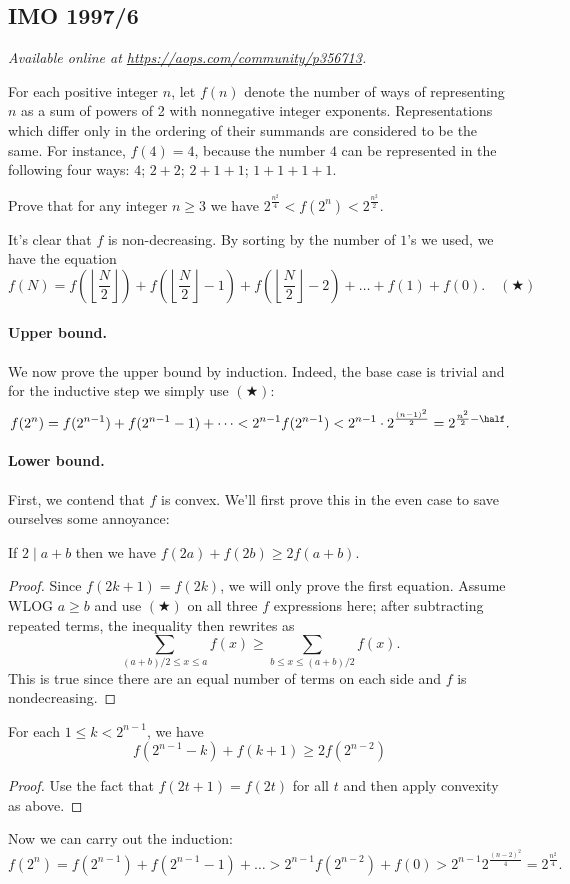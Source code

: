 \documentclass[11pt]{scrartcl}
\begin{document}
\subsection{IMO 1997/6}
\textsl{Available online at \url{https://aops.com/community/p356713}.}
\begin{mdframed}[style=mdpurplebox,frametitle={Problem statement}]
For each positive integer $n$,
let $f(n)$ denote the number of ways of representing $n$
as a sum of powers of 2 with nonnegative integer exponents.
Representations which differ only in the ordering
of their summands are considered to be the same.
For instance, $f(4) = 4$,
because the number $4$ can be represented in the following four ways:
$4$; $2+2$; $2+1+1$; $1+1+1+1$.

Prove that for any integer $n \geq 3$
we have $2^{\frac{n^2}{4}} < f(2^n) < 2^{\frac{n^2}2}$.
\end{mdframed}
It's clear that $f$ is non-decreasing.
By sorting by the number of $1$'s we used,
we have the equation
\[ f(N) =
  f\left( \left\lfloor \frac N2 \right\rfloor \right)
  +  f\left( \left\lfloor \frac N2 \right\rfloor -1 \right)
  +  f\left( \left\lfloor \frac N2 \right\rfloor -2 \right)
  + \dots
  + f(1) + f(0). \quad (\bigstar)
\]

\paragraph{Upper bound.}
We now prove the upper bound by induction.
Indeed, the base case is trivial and for the inductive step
we simply use $(\bigstar)$:
\[ f(2^n) = f(2^{n-1}) + f(2^{n-1}-1) + \dots
  < 2^{n-1} f(2^{n-1})
  < 2^{n-1} \cdot 2^{\frac{(n-1)^2}{2}}
  = 2^{\frac{n^2}{2} - \half}.
\]

\paragraph{Lower bound.}
First, we contend that $f$ is convex.
We'll first prove this in the even case
to save ourselves some annoyance:
\begin{claim*}
  If $2 \mid a+b$ then
  we have $f(2a) + f(2b) \ge 2 f\left( a+b \right)$.
\end{claim*}
\begin{proof}
  Since $f(2k+1) = f(2k)$, we will only prove the first equation.
  Assume WLOG $a \ge b$ and use
  $(\bigstar)$ on all three $f$ expressions here;
  after subtracting repeated terms, the inequality then rewrites as
  \[ \sum_{(a+b)/2 \le x \le a} f(x)
    \ge \sum_{b \le x \le (a+b)/2} f(x). \]
  This is true since there are an equal number of terms on each side
  and $f$ is nondecreasing.
\end{proof}
\begin{claim*}
  For each $1 \le k < 2^{n-1}$, we have
  \[ f(2^{n-1} - k) + f(k+1) \ge 2f(2^{n-2}) \]
\end{claim*}
\begin{proof}
  Use the fact that $f(2t+1)=f(2t)$ for all $t$
  and then apply convexity as above.
\end{proof}
Now we can carry out the induction:
\[ f(2^n) = f(2^{n-1}) + f(2^{n-1}-1) + \dots
  > 2^{n-1} f(2^{n-2}) + f(0)
  > 2^{n-1} 2^{\frac{(n-2)^2}{4}} = 2^{\frac{n^2}{4}}.
\]
\pagebreak
\end{document}
